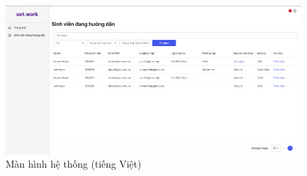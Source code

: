 \documentclass[./../main.tex]{subfiles}
\begin{document}
\begin{figure}[]
	\includegraphics[width=\linewidth]{./images/image12.png}
	\caption{Màn hình hệ thống (tiếng Việt)}
	\label{fig:vi_page}
\end{figure}
\end{document}
